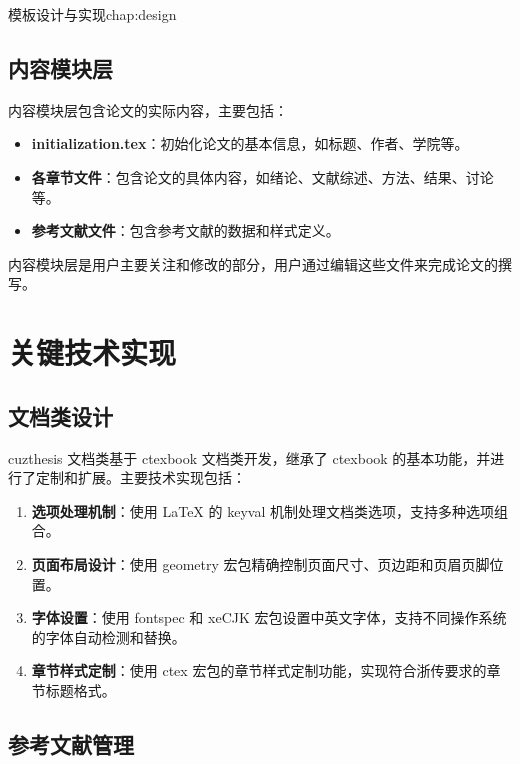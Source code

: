 \begin{cuzchapter}{模板设计与实现}{chap:design}
	\subsection{内容模块层}
	
	内容模块层包含论文的实际内容，主要包括：
	
	\begin{itemize}
		\item \textbf{initialization.tex}：初始化论文的基本信息，如标题、作者、学院等。
		
		\item \textbf{各章节文件}：包含论文的具体内容，如绪论、文献综述、方法、结果、讨论等。
		
		\item \textbf{参考文献文件}：包含参考文献的数据和样式定义。
	\end{itemize}
	
	内容模块层是用户主要关注和修改的部分，用户通过编辑这些文件来完成论文的撰写。
	
	\section{关键技术实现}\label{sec:key-technologies}
	
	\subsection{文档类设计}
	
	cuzthesis 文档类基于 ctexbook 文档类开发，继承了 ctexbook 的基本功能，并进行了定制和扩展。主要技术实现包括：
	
	\begin{enumerate}
		\item \textbf{选项处理机制}：使用 LaTeX 的 keyval 机制处理文档类选项，支持多种选项组合。
		
		\item \textbf{页面布局设计}：使用 geometry 宏包精确控制页面尺寸、页边距和页眉页脚位置。
		
		\item \textbf{字体设置}：使用 fontspec 和 xeCJK 宏包设置中英文字体，支持不同操作系统的字体自动检测和替换。
		
		\item \textbf{章节样式定制}：使用 ctex 宏包的章节样式定制功能，实现符合浙传要求的章节标题格式。
	\end{enumerate}
	
	\subsection{参考文献管理}
	

\end{cuzchapter}
